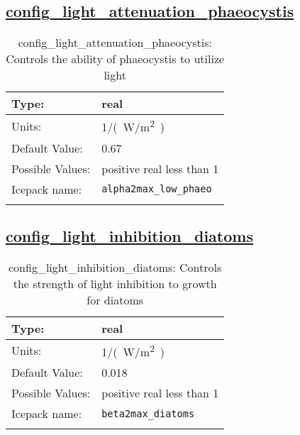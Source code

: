 \subsection[config\_light\_attenuation\_phaeocystis]{\hyperref[sec:nm_tab_biogeochemistry]{config\_light\_attenuation\_phaeocystis}}
\label{subsec:nm_sec_config_light_attenuation_phaeocystis}
\begin{center}
\begin{longtable}{| p{2.0in} || p{4.0in} |}
    \hline
    Type: & real \\
    \hline
    Units: & \si{1/(W/m^2)} \\
    \hline
    Default Value: & 0.67 \\
    \hline
    Possible Values: & positive real less than 1 \\
    \hline
    \hline
    Icepack name: & \verb+alpha2max_low_phaeo+ \\
    \caption{config\_light\_attenuation\_phaeocystis: Controls the ability of phaeocystis to utilize light}
\end{longtable}
\end{center}
\subsection[config\_light\_inhibition\_diatoms]{\hyperref[sec:nm_tab_biogeochemistry]{config\_light\_inhibition\_diatoms}}
\label{subsec:nm_sec_config_light_inhibition_diatoms}
\begin{center}
\begin{longtable}{| p{2.0in} || p{4.0in} |}
    \hline
    Type: & real \\
    \hline
    Units: & \si{1/(W/m^2)} \\
    \hline
    Default Value: & 0.018 \\
    \hline
    Possible Values: & positive real less than 1 \\
    \hline
    \hline
    Icepack name: & \verb+beta2max_diatoms+ \\
    \caption{config\_light\_inhibition\_diatoms: Controls the strength of light inhibition to growth for diatoms}
\end{longtable}
\end{center}
